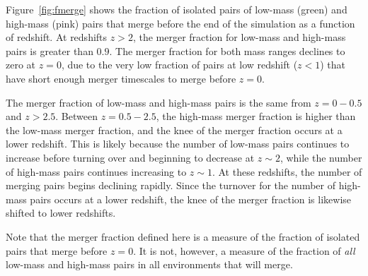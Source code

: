 \documentclass[twocolumn,linenumbers]{aastex631}
\begin{document}
Figure~\ref{fig:fmerge} shows the fraction of isolated pairs of low-mass (green) and high-mass (pink) pairs that merge before the end of the simulation as a function of redshift. 
At redshifts $z>2$, the merger fraction for low-mass and high-mass pairs is greater than $0.9$.
The merger fraction for both mass ranges declines to zero at $z=0$, due to the very low fraction of pairs at low redshift ($z<1$) that have short enough merger timescales to merge before $z=0$.

The merger fraction of low-mass and high-mass pairs is the same from $z=0-0.5$ and $z>2.5$. 
Between $z=0.5-2.5$, the high-mass merger fraction is higher than the low-mass merger fraction, and the knee of the merger fraction occurs at a lower redshift.
This is likely because the number of low-mass pairs continues to increase before turning over and beginning to decrease at $z\sim2$, while the number of high-mass pairs continues increasing to $z\sim1$. 
At these redshifts, the number of merging pairs begins declining rapidly. 
Since the turnover for the number of high-mass pairs occurs at a lower redshift, the knee of the merger fraction is likewise shifted to lower redshifts.

Note that the merger fraction defined here is a measure of the fraction of isolated pairs that merge before $z=0$. It is not, however, a measure of the fraction of \textit{all} low-mass and high-mass pairs in all environments that will merge. 
\end{document}
